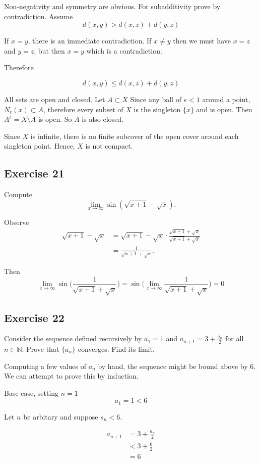 \documentclass{tufte-book}
\theoremstyle{mytheoremstyle}
\theoremstyle{mylemstyle}
\theoremstyle{mydefstyle}
\begin{document}
Non-negativity and symmetry are obvious. For subadditivity prove by contradiction.  Assume
\[ d(x,y) > d(x,z) + d(y,z) \]

If $x=y$, there is an immediate contradiction.  If $x\neq y$ then we must have $x=z$ and $y=z$, but then $x=y$ which is a contradiction.

Therefore

\[ d(x,y) \leq d(x,z) + d(y,z) \]

All sets are open and closed. Let $A \subset X$  Since any ball of $e<1$ around a point, $N_r(x) \subset A$, therefore every subset of $X$ is the singleton $\{x\}$ and is open. Then $A^c = X \setminus A$ is open.  So $A$ is also closed.

Since $X$ is infinite, there is no finite subcover of the open cover around each singleton point.  Hence, $X$ is not compact.

\subsection{Exercise 21}
Compute
\[ \lim_{x \to \infty} \sin(\sqrt{x+1} - \sqrt{x}). \]

Observe
\begin{align*}
\sqrt{x+1} - \sqrt{x} &= \sqrt{x+1} - \sqrt{x} \cdot \frac{ \sqrt{x+1} + \sqrt{x} }{ \sqrt{x+1} + \sqrt{x}}\\
&= \frac{1}{\sqrt{x+1} + \sqrt{x}}.
\end{align*}

Then
\[ \lim_{x \to \infty} \sin\big(\frac{1}{\sqrt{x+1} + \sqrt{x}}\big) = \sin\big(\lim_{x \to \infty}\frac{1}{\sqrt{x+1} + \sqrt{x}}\big) = 0 \]

\subsection{Exercise 22}
Consider the sequence defined recursively by $a_1 = 1$ and $a_{n+1} = 3 + \frac{a_n}{2}$ for all $n \in \mathbb{N}$.  Prove that $\{a_n\}$ converges.  Find its limit.

Computing a few values of $a_n$ by hand, the sequence might be bound above by $6$.  We can attempt to prove this by induction.

Base case, setting $n=1$
\[ a_1 = 1 < 6 \]

Let $n$ be arbitary and suppose $s_n < 6$.

\begin{align*}
a_{n+1} &= 3 + \frac{a_n}{2} \\
&< 3 + \frac{6}{2} \\
&= 6
\end{align*}
\end{document}
